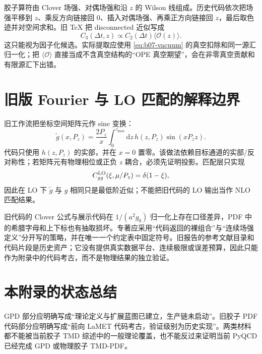 胶子算符由 Clover 场强、对偶场强和沿 $z$ 的 Wilson 线组成。历史代码依次把场强平移到 $z$、乘反方向链接回 0、插入对偶场强、再乘正方向链接回 $z$，最后取色迹并对空间求和。旧 TeX 把 disconnected 近似写成
\begin{equation}
  C_3(\Delta t,z)\propto C_2(\Delta t)\langle\mathcal O(z)\rangle.
  \label{eq:b07-legacyfactor}
\end{equation}
这只能视为因子化候选。实际提取应使用 \eqref{eq:b07-vacuum} 的真空扣除和同一源汇归一化；把 $\langle\mathcal O\rangle$ 直接当成不含真空结构的“OPE 真空期望”，会在非零真空贡献和有限源汇下出错。

\section{旧版 Fourier 与 LO 匹配的解释边界}

旧工作流把坐标空间矩阵元作 sine 变换：
\begin{equation}
  \tilde g(x,P_z)=\frac{2P_z}{x}
  \int_0^{z_{\max}}\mathrm dz\,
  h(z,P_z)\sin(xP_zz).
  \label{eq:b07-legacyfourier}
\end{equation}
代码只使用 $h(z,P_z)$ 的实部，并在 $x=0$ 置零。该做法依赖目标通道的实部/反对称性；若矩阵元有物理相位或正负 $z$ 耦合，必须先证明投影。匹配层只实现
\begin{equation}
  C_{gg}^{\rm LO}(\xi,\mu/P_z)=\delta(1-\xi),
  \label{eq:b07-legacyLO}
\end{equation}
因此在 LO 下 $\tilde g$ 与 $g$ 相同只是最低阶近似；不能把旧代码的 LO 输出当作 NLO 匹配结果。

旧代码的 Clover 公式与展示代码在 $1/(a^2g_0)$ 归一化上存在口径差异，PDF 中的希腊字母和上下标也有抽取损坏。专著应采用“代码返回的裸组合”与“连续场强定义”分开写的策略，并在唯一一个约定表中固定符号。旧报告的参考文献目录和代码片段是历史资产；它没有提供真实数据平台、连续极限或误差预算，因此只能作为附录中的代码考古，而不是物理结果的独立验证。

\section{本附录的状态总结}

GPD 部分应明确写成“理论定义与扩展蓝图已建立，生产链未启动”。旧胶子 PDF 代码部分应明确写成“前向 LaMET 代码考古，验证级别为历史实现”。两类材料都不能被当前胶子 TMD 综述中的一般理论覆盖，也不能反过来证明当前 PyQCD 已经完成 GPD 或物理胶子 TMD-PDF。
